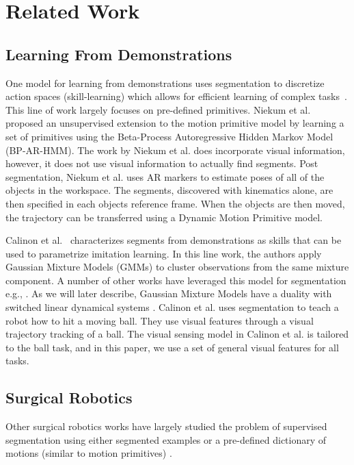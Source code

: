 \documentclass[0-main.tex]{subfiles}
\begin{document}
\section{Related Work}


\subsection{Learning From Demonstrations}
One model for learning from demonstrations uses segmentation to discretize action spaces (skill-learning) which allows for efficient learning of complex tasks~\cite{ijspreet2002learning,pastor2009learning}.
This line of work largely focuses on pre-defined primitives.
Niekum et al. \cite{niekum2012learning} proposed an unsupervised extension to the motion primitive model by learning a set of primitives using the Beta-Process Autoregressive Hidden Markov Model (BP-AR-HMM).
The work by Niekum et al. does incorporate visual information, however, it does not use visual information to actually find segments.
Post segmentation,  Niekum et al. uses AR markers to estimate poses of all of the objects in the workspace.
The segments, discovered with kinematics alone, are then specified in each objects reference frame.
When the objects are then moved, the trajectory can be transferred using a Dynamic Motion Primitive model.

Calinon et al.~\cite{calinon2014skills, calinon2010evaluation} characterizes segments from demonstrations as skills that can be used to parametrize imitation learning.
In this line work, the authors apply Gaussian Mixture Models (GMMs) to cluster observations from the same mixture component.
A number of other works have leveraged this model for segmentation e.g., \cite{konidaris2009efficient, konidaris2011robot, subramanian2011learning}.
As we will later describe, Gaussian Mixture Models have a duality with switched linear dynamical systems \cite{moldovan2013dirichlet}.
Calinon et al. \cite{calinon2010evaluation} uses segmentation to teach a robot how to hit a moving ball.
They use visual features through a visual trajectory tracking of a ball.
The visual sensing model in Calinon et al. is tailored to the ball task, and in this paper, we use a set of general visual features for all tasks.

\subsection{Surgical Robotics}
Other surgical robotics works have largely studied the problem of supervised segmentation using either segmented examples or a pre-defined dictionary of motions (similar to motion primitives) \cite{varadarajan2009data,tao2013surgical,lea15improved, zappella2013surgical, quellec2014segmentation}.
\end{document}
